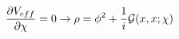 \begin{equation}
\frac{\partial V_{eff}}{\partial \chi} =0 \rightarrow \rho=\phi^2 + \frac{1}{i}
{\cal G}(x,x;\chi) \end{equation}

